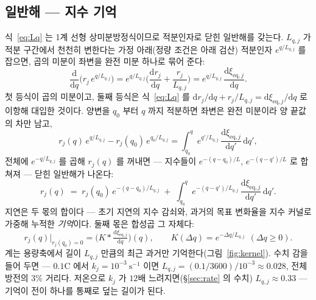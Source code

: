 \documentclass[11pt,a4paper]{article}
\newcommand{\dd}{\mathrm{d}}
\newcommand{\eq}{\mathrm{eq}}
\begin{document}
\subsection{일반해 — 지수 기억}
식~\eqref{eq:Lq} 는 1계 선형 상미분방정식이므로 적분인자로 닫힌 일반해를 갖는다. $L_{q,j}$ 가 적분
구간에서 천천히 변한다는 가정 아래(정량 조건은 아래 검산) 적분인자 $e^{q/L_{q,j}}$ 를 잡으면, 곱의
미분이 좌변을 완전 미분 하나로 묶어 준다:
\begin{equation}
\frac{\dd}{\dd q}\Big(r_j\,e^{q/L_{q,j}}\Big)
=e^{q/L_{q,j}}\Big(\frac{\dd r_j}{\dd q}+\frac{r_j}{L_{q,j}}\Big)
=e^{q/L_{q,j}}\,\frac{\dd\xi_{\eq,j}}{\dd q}.
\label{eq:intfactor}
\end{equation}
첫 등식이 곱의 미분이고, 둘째 등식은 식~\eqref{eq:Lq} 를 $\dd r_j/\dd q+r_j/L_{q,j}
=\dd\xi_{\eq,j}/\dd q$ 로 이항해 대입한 것이다. 양변을 $q_0$ 부터 $q$ 까지 적분하면 좌변은 완전
미분이라 양 끝값의 차만 남고,
\begin{equation}
r_j(q)\,e^{q/L_{q,j}}-r_j(q_0)\,e^{q_0/L_{q,j}}
=\int_{q_0}^{q}e^{q'/L_{q,j}}\,\frac{\dd\xi_{\eq,j}}{\dd q'}\,\dd q',
\label{eq:intfacint}
\end{equation}
전체에 $e^{-q/L_{q,j}}$ 를 곱해 $r_j(q)$ 를 꺼내면 — 지수들이 $e^{-(q-q_0)/L}$, $e^{-(q-q')/L}$ 로
합쳐져 — 닫힌 일반해가 나온다:
\begin{equation}
r_j(q)\;=\;r_j(q_0)\,e^{-(q-q_0)/L_{q,j}}
\;+\;\int_{q_0}^{q}e^{-(q-q')/L_{q,j}}\,\frac{\dd\xi_{\eq,j}}{\dd q'}\,\dd q'.
\label{eq:memory}
\end{equation}
지연은 두 몫의 합이다 — 초기 지연의 지수 감쇠와, 과거의 목표 변화율을 지수 커널로 가중해 누적한
\emph{기억}이다. 둘째 몫은 합성곱 그 자체다:
\begin{equation}
r_j(q)\Big|_{r_j(q_0)=0}
=\big(K*\tfrac{\dd\xi_{\eq,j}}{\dd q}\big)(q),
\qquad K(\Delta q)=e^{-\Delta q/L_{q,j}}\ \ (\Delta q\ge0).
\label{eq:conv}
\end{equation} 계는 용량축에서 길이 $L_{q,j}$ 만큼의 최근 과거만 기억한다(그림~\ref{fig:kernel}).
수치 감을 들어 두면 — $0.1$C 에서 $k_j=10^{-3}\ \mathrm{s^{-1}}$ 이면
$L_{q,j}=(0.1/3600)/10^{-3}\approx0.028$, 전체 방전의 $3\%$ 거리다. 저온으로 $k_j$ 가 $12$배
느려지면(\S\ref{sec:rate} 의 수치) $L_{q,j}\approx0.33$ — 기억이 전이 하나를 통째로 덮는 길이가 된다.
\end{document}
